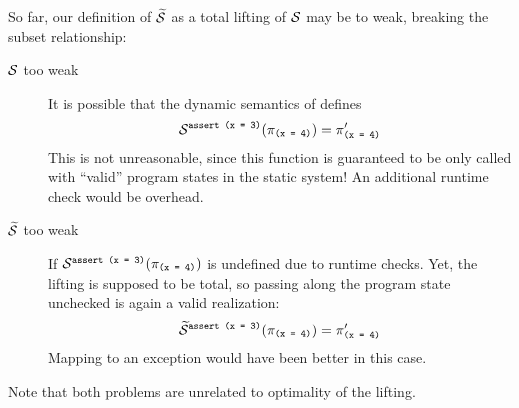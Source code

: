 So far, our definition of $\widetilde{\mathcal{S}}$ as a total lifting of $\mathcal{S}$ may be to weak, breaking the subset relationship:
\begin{description}
    \item[$\mathcal{S}$ too weak]
    It is possible that the dynamic semantics of \svl defines
    $$\mathcal{S}^{\textup{\texttt{assert \textup{\texttt{(x = 3)}}}}}(\pi_{\textup{\texttt{(x = 4)}}}) = \pi'_{\textup{\texttt{(x = 4)}}}$$
    This is not unreasonable, since this function is guaranteed to be only called with “valid” program states in the static system!
    An additional runtime check would be overhead.
    
    \item[$\widetilde{\mathcal{S}}$ too weak]
    If $\mathcal{S}^{\textup{\texttt{assert \textup{\texttt{(x = 3)}}}}}(\pi_{\textup{\texttt{(x = 4)}}})$ is undefined due to runtime checks.
    Yet, the lifting is supposed to be total, so passing along the program state unchecked is again a valid realization:
    $$\widetilde{\mathcal{S}}^{\textup{\texttt{assert \textup{\texttt{(x = 3)}}}}}(\pi_{\textup{\texttt{(x = 4)}}}) = \pi'_{\textup{\texttt{(x = 4)}}}$$
    Mapping to an exception would have been better in this case.
\end{description}
Note that both problems are unrelated to optimality of the lifting.

